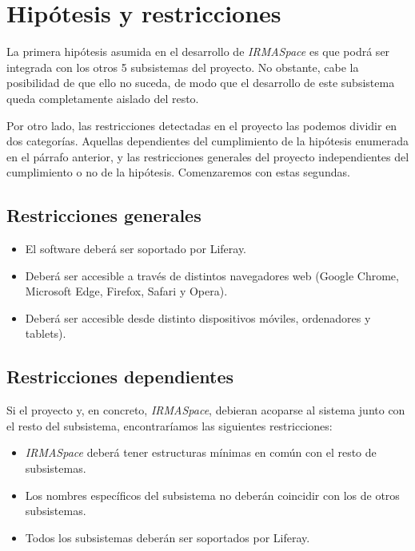 \section{Hipótesis y restricciones}\label{sec:constaints}

\par La primera hipótesis asumida en el desarrollo de \textit{IRMASpace} es que podrá ser integrada con los otros 5 subsistemas del proyecto. No obstante, cabe la posibilidad de que ello no suceda, de modo que el desarrollo de este subsistema queda completamente aislado del resto.

\par Por otro lado, las restricciones detectadas en el proyecto las podemos dividir en dos categorías. Aquellas dependientes del cumplimiento de la hipótesis enumerada en el párrafo anterior, y las restricciones generales del proyecto independientes del cumplimiento o no de la hipótesis. Comenzaremos con estas segundas.

\subsection{Restricciones generales}
\begin{itemize}
    \item El software deberá ser soportado por Liferay.
    \item Deberá ser accesible a través de distintos navegadores web (Google Chrome, Microsoft Edge, Firefox, Safari y Opera).
    \item Deberá ser accesible desde distinto dispositivos móviles, ordenadores y tablets).
\end{itemize}

\subsection{Restricciones dependientes}
\par Si el proyecto y, en concreto, \textit{IRMASpace}, debieran acoparse al sistema junto con el resto del subsistema, encontraríamos las siguientes restricciones:
\begin{itemize}
    \item \textit{IRMASpace} deberá tener estructuras mínimas en común con el resto de subsistemas.
    \item Los nombres específicos del subsistema no deberán coincidir con los de otros subsistemas.
    \item Todos los subsistemas deberán ser soportados por Liferay.
\end{itemize}
